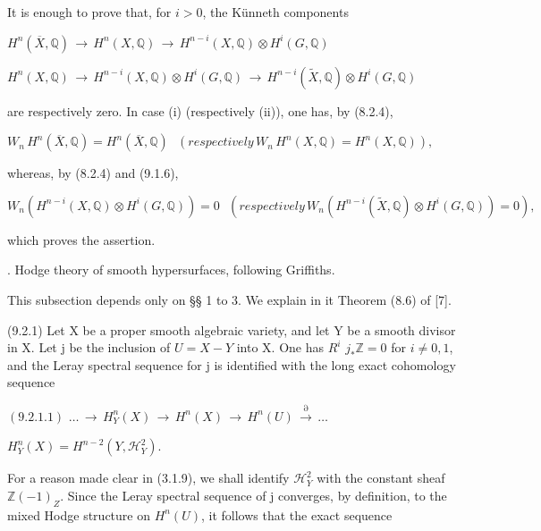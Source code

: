 \documentclass[11pt,twoside]{article}
\newcommand{\DFormula}[1]{%
  \par\smallskip\noindent\hspace*{0pt}\(\displaystyle #1\)\par\smallskip
}
\begin{document}
It is enough to prove that, for \(i>0\), the Künneth components\par
\par\medskip
\DFormula{H^{n}(\overline{X},\mathbb{Q})\,\to \,H^{n}(X,\mathbb{Q})\,\to \,H^{n−i}(X,\mathbb{Q})\otimes H^{i}(G,\mathbb{Q})}
\par\medskip
\DFormula{H^{n}(X,\mathbb{Q})\,\to \,H^{n−i}(X,\mathbb{Q})\otimes H^{i}(G,\mathbb{Q})\,\to \,H^{n−i}(\widetilde{X},\mathbb{Q})\otimes H^{i}(G,\mathbb{Q})}
\par\medskip
are respectively zero. In case (i) (respectively (ii)), one has, by (8.2.4),\par
\par\medskip
\DFormula{W_{n}\,H^{n}(\overline{X},\mathbb{Q})=H^{n}(\overline{X},\mathbb{Q})\,\,\,\,(respectively\,W_{n}\,H^{n}(X,\mathbb{Q})=H^{n}(X,\mathbb{Q})),}
\par\medskip
whereas, by (8.2.4) and (9.1.6),\par
\par\medskip
\DFormula{W_{n}(H^{n−i}(X,\mathbb{Q})\otimes H^{i}(G,\mathbb{Q}))=0\,\,\,\,(respectively\,W_{n}(H^{n−i}(\widetilde{X},\mathbb{Q})\otimes H^{i}(G,\mathbb{Q}))=0),}
\par\medskip
which proves the assertion.\par
\par{}. Hodge theory of smooth hypersurfaces, following Griffiths.\par
\par\medskip
This subsection depends only on §§ 1 to 3. We explain in it Theorem (8.6) of [7].\par
\par\medskip
(9.2.1) Let X be a proper smooth algebraic variety, and let Y be a smooth divisor in X. Let j be the inclusion of \(U=X−Y\) into X. One has \(R^{i}\) \(j_{\ast }\mathbb{Z}=0\) for \(i\neq 0,1\), and the Leray spectral sequence for j is identified with the long exact cohomology sequence\par
\par\medskip
\DFormula{(9.2.1.1)\,\,…\,\to \,H_{Y}^{n}(X)\,\to \,H^{n}(X)\,\to \,H^{n}(U)\,\xrightarrow{\partial }\,…}
\par\medskip
\DFormula{H_{Y}^{n}(X)=H^{n−2}(Y,\mathcal{H}_{Y}^{2}).}
\par\medskip
For a reason made clear in (3.1.9), we shall identify \(\mathcal{H}_{Y}^{2}\) with the constant sheaf \(\mathbb{Z}(−1)_{Z}\). Since the Leray spectral sequence of j converges, by definition, to the mixed Hodge structure on \(H^{n}(U)\), it follows that the exact sequence\par
\end{document}
